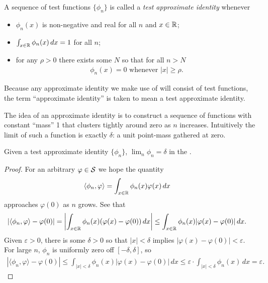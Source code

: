     \begin{defn}
      A sequence of test functions $\{\phi_n\}$ is called a \emph{test approximate identity} whenever
      \begin{itemize}
        \item $\phi_n(x)$ is non-negative and real for all $n$ and $x\in\R$;
        \item $\int_{x\in\R}\phi_n(x)\,dx=1$ for all $n$;
        \item for any $\rho>0$ there exists some $N$ so that for all $n>N$ 
          \begin{align*}
            \phi_n(x) = 0 \text{ whenever } |x|\ge\rho \text{.}
          \end{align*}
      \end{itemize}
      Because any approximate identity we make use of will consist of  test functions, the term ``approximate identity'' is taken to mean a test approximate identity.
    \end{defn}
    The idea of an approximate identity is to construct a sequence of functions with constant ``mass'' 1 that clusters tightly around zero as $n$ increases.
    Intuitively the limit of such a function is exactly $\delta$: a unit point-mass gathered at zero.

    \begin{thm}
      \label{thm:approxid}
      Given a test approximate identity $\{\phi_n\}$, $\lim_n \phi_n = \delta$ in the \ws.
    \end{thm}
    \begin{proof}
      For an arbitrary $\varphi\in\S$ we hope the quantity
      \begin{align*}
        \langle\phi_n,\varphi\rangle 
        &=\int_{x\in\R} \phi_n(x)\varphi(x)\,dx
      \end{align*}
      approaches $\varphi(0)$ as $n$ grows.
      See that
      \begin{align*}
        |\langle\phi_n,\varphi\rangle - \varphi(0)|
        &=\left| \int_{x\in\R} \phi_n(x)(\varphi(x)-\varphi(0))\,dx \right|
        \le \int_{x\in\R} \phi_n(x)|\varphi(x)-\varphi(0)|\,dx \text{.}
      \end{align*}
      Given $\varepsilon>0$, there is some $\delta>0$ so that $|x|<\delta$ implies $|\varphi(x)-\varphi(0)|<\varepsilon$.
      For large $n$, $\phi_n$ is uniformly zero off $[-\delta,\delta]$, so
      \begin{align*}
        |\langle\phi_n,\varphi\rangle - \varphi(0)|
        \le \int_{|x|<\delta} \phi_n(x)|\varphi(x)-\varphi(0)|\,dx
        \le \varepsilon \cdot \int_{|x|<\delta} \phi_n(x)\,dx
        = \varepsilon \text{.}
      \end{align*}
    \end{proof}

